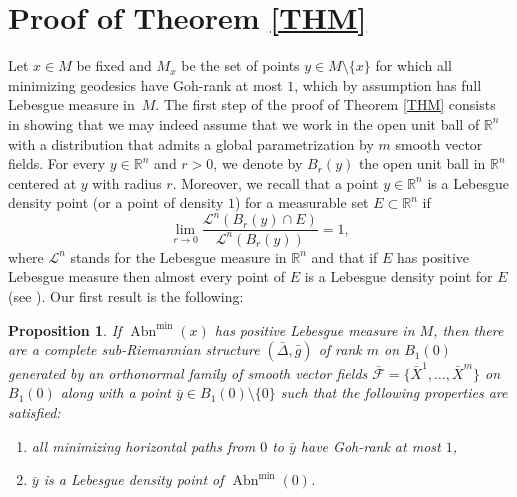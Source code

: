 \documentclass[JEP,XML,SOM,Unicode,NoFloatCountersInSection,published]{cedram}
\newenvironment{enumeratei}
{\bgroup\def\theenumi{\roman{enumi}}\def\theenumii{\arabic{enumii}}\begin{enumerate}}
{\end{enumerate}\egroup}
\DeclareMathOperator{\Abn}{Abn}
\newcommand\R{\mathbb R}
\newtheorem{proposition}[theorem]{Proposition}
\theoremstyle{definition}
\begin{document}
\section{Proof of Theorem \ref{THM}}\label{SECProofTHM}

Let $x\in M$ be fixed and $M_x$ be the set of points $y\in M\setminus\{x\}$ for which all minimizing geodesics have Goh-rank at most $1$, which by assumption has full Lebesgue measure in~$M$. The first step of the proof of Theorem \ref{THM} consists in showing that we may indeed assume that we work in the open unit ball of $\R^n$ with a distribution that admits a global parametrization by $m$ smooth vector fields. For every $y \in \R^n$ and $r>0$, we denote by $B_r(y)$ the open unit ball in $\R^n$ centered at $y$ with radius $r$. Moreover, we recall that a point $y\in \R^n$ is a Lebesgue density point (or a point of density $1$) for a measurable set $E\subset \R^n$ if
\[
\lim_{r\to 0} \frac{\mathcal{L}^n\left(B_r(y)\cap E \right)}{\mathcal{L}^n\left(B_r(y)\right)}=1,
\]
where $\mathcal{L}^n$ stands for the Lebesgue measure in $\R^n$ and that if $E$ has positive Lebesgue measure then almost every point of $E$ is a Lebesgue density point for $E$ (see \eg \cite{eg15}). Our first result is the following:

\begin{proposition}\label{PROPSTEP1}
If $\Abn^{\min}(x)$ has positive Lebesgue measure in $M$, then there are a complete sub-Riemannian structure $(\bar{\Delta},\bar{g})$ of rank $m$ on $B_1(0)$ generated by an orthonormal family of smooth vector fields $\bar{\mathcal{F}}=\{\bar{X}^1, \ldots, \bar{X}^m\}$ on $B_1(0)$ along with a point $\bar{y} \in B_1(0)\setminus \{0\}$ such that the following properties are satisfied:
\begin{enumeratei}
\item
all minimizing horizontal paths from $0$ to $\bar{y}$ have Goh-rank at most $1$,
\item
$\bar{y}$ is a Lebesgue density point of $\Abn^{\min}(0)$.
\end{enumeratei}
\end{proposition}
\end{document}
